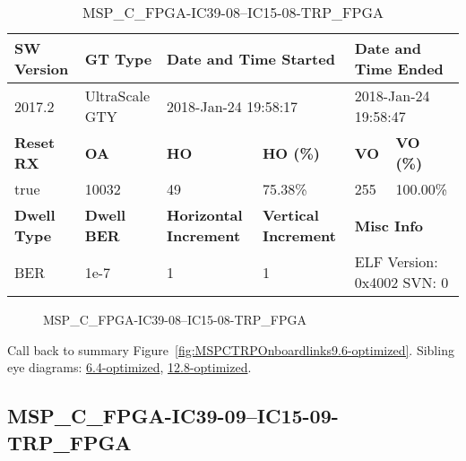 \begin{table}[h]
\centering
\caption{MSP\_C\_FPGA-IC39-08--IC15-08-TRP\_FPGA}
\label{tab:MSPCFPGAIC3908IC1508TRPFPGA9.6-optimized}
\begin{tabular}{@{}|l|l|l|l|l|l|@{}}
\toprule
\textbf{SW Version}                & \textbf{GT Type}   & \multicolumn{2}{l|}{\textbf{Date and Time Started}}            & \multicolumn{2}{l|}{\textbf{Date and Time Ended}}        \\ \midrule
2017.2                       & UltraScale GTY          & \multicolumn{2}{l|}{2018-Jan-24 19:58:17}                   & \multicolumn{2}{l|}{2018-Jan-24 19:58:47}               \\ \midrule
\textbf{Reset RX}                  & \textbf{OA} & \textbf{HO}   & \textbf{HO (\%)} & \textbf{VO} & \textbf{VO (\%)} \\ \midrule
true & 10032        & 49          & 75.38\%        & 255        & 100.00\%       \\ \midrule
\textbf{Dwell Type}                & \textbf{Dwell BER} & \textbf{Horizontal Increment} & \textbf{Vertical Increment}    & \multicolumn{2}{l|}{\textbf{Misc Info}}                  \\ \midrule
BER                            & 1e-7        & 1        & 1           & \multicolumn{2}{l|}{ELF Version: 0x4002 SVN: 0}                         \\ \bottomrule
\end{tabular}
\end{table}

\begin{figure}[h]
\caption{MSP\_C\_FPGA-IC39-08--IC15-08-TRP\_FPGA} \label{fig:MSPCFPGAIC3908IC1508TRPFPGA9.6-optimized}
\end{figure}

Call back to summary Figure~\ref{fig:MSPCTRPOnboardlinks9.6-optimized}.
Sibling eye diagrams: \hyperref[sec:MSPCFPGAIC3908IC1508TRPFPGA6.4-optimized]{6.4-optimized}, \hyperref[sec:MSPCFPGAIC3908IC1508TRPFPGA12.8-optimized]{12.8-optimized}.

\clearpage
\newpage


\subsection{MSP\_C\_FPGA-IC39-09--IC15-09-TRP\_FPGA}\label{sec:MSPCFPGAIC3909IC1509TRPFPGA9.6-optimized}

